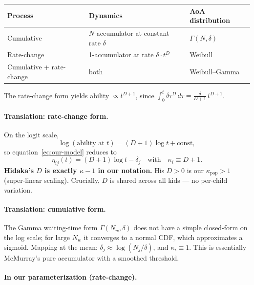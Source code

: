 \documentclass[11pt]{article}
\begin{document}
\begin{center}
\renewcommand{\arraystretch}{1.10}
\begin{tabular}{@{}lll@{}}
\toprule
\textbf{Process} & \textbf{Dynamics} & \textbf{AoA distribution} \\
\midrule
Cumulative & $N$-accumulator at constant rate $\delta$ & $\Gamma(N, \delta)$ \\
Rate-change & 1-accumulator at rate $\delta \cdot t^D$ & Weibull \\
Cumulative + rate-change & both & Weibull--Gamma \\
\bottomrule
\end{tabular}
\end{center}

The rate-change form yields ability $\propto t^{D+1}$, since
$\int_0^t \delta \tau^D\,d\tau = \frac{\delta}{D+1}\,t^{D+1}$.

\paragraph{Translation: rate-change form.}
On the logit scale,
\begin{equation}
\log(\text{ability at } t) = (D+1)\log t + \mathrm{const},
\end{equation}
so equation~\eqref{eq:our-model} reduces to
\begin{equation}
\eta_{ij}(t) = (D+1)\log t - \delta_j
\quad\text{with}\quad \kappa_i \equiv D+1.
\end{equation}
\textbf{Hidaka's $D$ is exactly $\kappa - 1$ in our notation.} His
$D > 0$ is our $\kappa_{\text{pop}} > 1$ (super-linear scaling).
Crucially, $D$ is shared across all kids — no per-child variation.

\paragraph{Translation: cumulative form.}
The Gamma waiting-time form $\Gamma(N_w, \delta)$ does not have a
simple closed-form on the log scale; for large $N_w$ it converges
to a normal CDF, which approximates a sigmoid. Mapping at the
mean: $\delta_j \approx \log(N_j/\delta)$, and $\kappa_i \equiv 1$.
This is essentially McMurray's pure accumulator with a smoothed
threshold.

\paragraph{In our parameterization (rate-change).}
\end{document}
